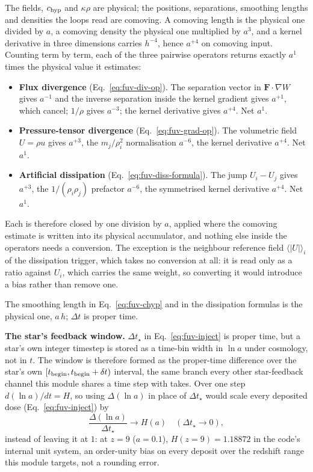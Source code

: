 The fields, $c_{\rm hyp}$ and $\kappa\rho$ are physical; the positions,
separations, smoothing lengths and densities the loops read are comoving.
A comoving length is the physical one divided by $a$, a comoving density
the physical one multiplied by $a^3$, and a kernel derivative in three
dimensions carries $h^{-4}$, hence $a^{+4}$ on comoving input. Counting
term by term, each of the three pairwise operators returns exactly $a^{1}$
times the physical value it estimates:
\begin{itemize}
  \item \textbf{Flux divergence} (Eq.~\ref{eq:fuv-div-op}). The separation
    vector in $\mathbf F\cdot\nabla W$ gives $a^{-1}$ and the inverse
    separation inside the kernel gradient gives $a^{+1}$, which cancel;
    $1/\rho$ gives $a^{-3}$; the kernel derivative gives $a^{+4}$. Net
    $a^{1}$.
  \item \textbf{Pressure-tensor divergence} (Eq.~\ref{eq:fuv-grad-op}).
    The volumetric field $U = \rho u$ gives $a^{+3}$, the $m_j/\rho_i^2$
    normalisation $a^{-6}$, the kernel derivative $a^{+4}$. Net $a^{1}$.
  \item \textbf{Artificial dissipation} (Eq.~\ref{eq:fuv-diss-formula}).
    The jump $U_i - U_j$ gives $a^{+3}$, the $1/(\rho_i\rho_j)$ prefactor
    $a^{-6}$, the symmetrised kernel derivative $a^{+4}$. Net $a^{1}$.
\end{itemize}
Each is therefore closed by one division by $a$, applied where the
comoving estimate is written into its physical accumulator, and nothing
else inside the operators needs a conversion. The exception is the
neighbour reference field $\langle|U|\rangle_i$ of the dissipation
trigger, which takes no conversion at all: it is read only as a ratio
against $U_i$, which carries the same weight, so converting it would
introduce a bias rather than remove one.

The smoothing length in Eq.~\ref{eq:fuv-chyp} and in the dissipation
formulas is the physical one, $a\,h$; $\Delta t$ is proper time.

\textbf{The star's feedback window.} $\Delta t_\star$ in
Eq.~\ref{eq:fuv-inject} is proper time, but a star's own integer
timestep is stored as a time-bin width in $\ln a$ under cosmology, not
in $t$. The window is therefore formed as the proper-time difference over
the star's own
$[t_{\rm begin}, t_{\rm begin}+\delta t)$ interval, the same
branch every other star-feedback channel this module shares a time step
with takes.
Over one step $d(\ln a)/dt = H$, so using $\Delta(\ln a)$ in place of
$\Delta t_\star$ would scale every deposited dose (Eq.~\ref{eq:fuv-inject})
by
\begin{equation}
  \frac{\Delta(\ln a)}{\Delta t_\star} \to H(a) \quad (\Delta t_\star\to0) ,
  \label{eq:fuv-cosmo-window}
\end{equation}
instead of leaving it at $1$: at $z=9$ ($a=0.1$), $H(z=9) = 1.18872$ in
the code's internal unit system, an order-unity bias on every deposit
over the redshift range this module targets, not a rounding error.

